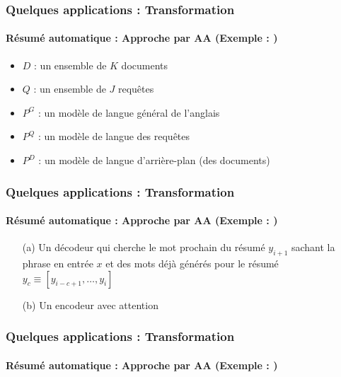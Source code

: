 \documentclass[xcolor=table]{beamer}
\begin{document}
\begin{frame}
	\frametitle{Quelques applications : Transformation}
	\framesubtitle{Résumé automatique : Approche par AA (Exemple : \cite{06-daumeiii-marcu})}
	
	\begin{minipage}{.6\textwidth}
		\begin{itemize}
			\item $D$ : un ensemble de $K$ documents
			\item $Q$ : un ensemble de $J$ requêtes
			\item $P^G$ : un modèle de langue général de l'anglais 
			\item $P^Q$ : un modèle de langue des requêtes
			\item $P^D$ : un modèle de langue d'arrière-plan (des documents)
		\end{itemize}
	\end{minipage}
	\begin{minipage}{.38\textwidth}
	\end{minipage}
	
\end{frame}

\begin{frame}
	\frametitle{Quelques applications : Transformation}
	\framesubtitle{Résumé automatique : Approche par AA (Exemple : \cite{15-rush-al})}
	
	\begin{center}
	\end{center}
	
	\begin{itemize}
		\item[(a)] Un décodeur qui cherche le mot prochain du résumé $y_{i+1}$ sachant la phrase en entrée $x$ et des mots déjà générés pour le résumé $y_c \equiv [y_{i-c+1},\ldots, y_i]$
		\item[(b)] Un encodeur avec attention
	\end{itemize}
	
\end{frame}

\begin{frame}
	\frametitle{Quelques applications : Transformation}
	\framesubtitle{Résumé automatique : Approche par AA (Exemple : \cite{18-narayan-al})}
	
	
\end{frame}
\end{document}
